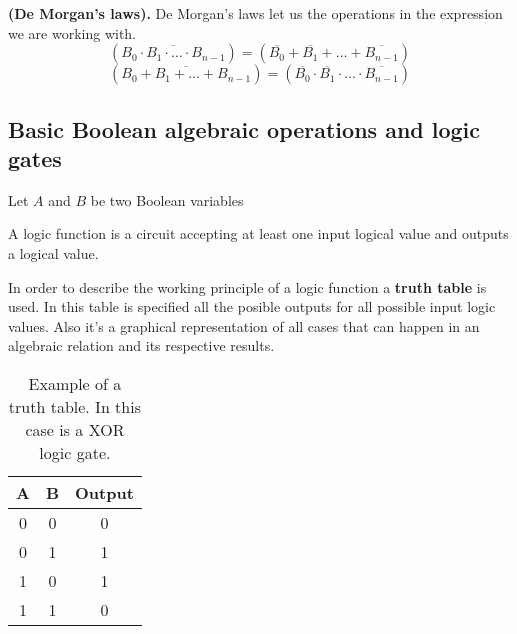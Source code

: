 \begin{definition}
    \textbf{(De Morgan's laws).} De Morgan's laws let us the operations in the expression we are working with.
\begin{equation}
    \left(\overline{B_0\cdot B_1\cdot\ldots\cdot B_{n-1}} \right) = \left( \overline{B_0} + \overline{B_1} + \ldots + \overline{B_{n-1}} \right)
\end{equation} 
\begin{equation}
    \left( \overline{B_0 + B_1 + \ldots + B_{n-1}} \right) = \left( \overline{B_0}\cdot\overline{B_1}\cdot\ldots\cdot\overline{B_{n-1}} \right)  
\end{equation}
\end{definition}


\subsection{Basic Boolean algebraic operations and logic gates}
\begin{definition}
    Let $A$ and $B$ be two Boolean variables
\end{definition}

\begin{definition}
    A logic function is a circuit accepting at least one input logical value and outputs a logical value.
\end{definition}

In order to describe the working principle of a logic function a \textbf{truth table} is used. In this table is specified all the posible outputs for all possible input logic values. Also it's a graphical representation of all cases that can happen in an algebraic relation and its respective results.
\begin{table}[h!]
\centering
\begin{tabular}{ |c|c|c| }
    \hline 
    \textbf{A} & \textbf{B} & \textbf{Output} \\
    \hline
    0 & 0 & 0 \\
    0 & 1 & 1 \\
    1 & 0 & 1 \\
    1 & 1 & 0 \\
    \hline
\end{tabular}
\caption{Example of a truth table. In this case is a XOR logic gate.}
\end{table}

